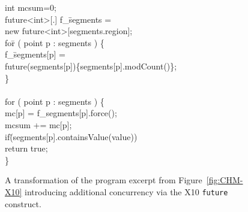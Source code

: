
\begin{figure}[tp]
  \begin{code}
int mcsum=0; \\
future<int>[.] f\_\=segments = \\
\>new future<int>[segments.region]; \\
fo\=r ( point p : segments ) \{ \\
\>  f\_\=segments[p] = \\
\>\>future(segments[p])\{segments[p].modCount()\}; \\
\} \\ \\
for ( point p : segments ) \{ \\
\>  mc[p] = f\_segments[p].force(); \\
\>  mcsum += mc[p]; \\
\>  if\=(segments[p].containsValue(value)) \\
\>\>    return true; \\
\} 
  \end{code}
\caption{\label{fig:CHM-X10-future} A transformation of the program excerpt 
from Figure~\ref{fig:CHM-X10} introducing additional concurrency via the 
X10 {\tt future} construct.}
\end{figure}





